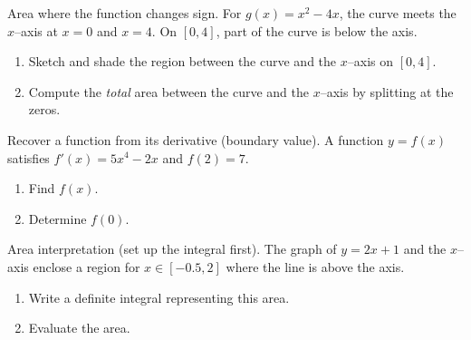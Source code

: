 \documentclass[11pt]{article}
\def\textbf#1{#1}%
\newcounter{question}
\begin{document}
\begin{question}
\textbf{Area where the function changes sign.}
For $g(x)=x^{2}-4x$, the curve meets the $x$–axis at $x=0$ and $x=4$. On $[0,4]$, part of the curve is below the axis.
\begin{enumerate}
  \item Sketch and shade the region between the curve and the $x$–axis on $[0,4]$.
  \item Compute the \emph{total} area between the curve and the $x$–axis by splitting at the zeros.
\end{enumerate}
\end{question}

\begin{question}
\textbf{Recover a function from its derivative (boundary value).}
A function $y=f(x)$ satisfies $f'(x)=5x^{4}-2x$ and $f(2)=7$.
\begin{enumerate}
  \item Find $f(x)$.
  \item Determine $f(0)$.
\end{enumerate}
\end{question}

\begin{question}
\textbf{Area interpretation (set up the integral first).}
The graph of $y=2x+1$ and the $x$–axis enclose a region for $x\in[-0.5,2]$ where the line is above the axis.
\begin{enumerate}
  \item Write a definite integral representing this area.
  \item Evaluate the area.

\begin{center}
\end{center}
\end{enumerate}
\end{question}
\end{document}
